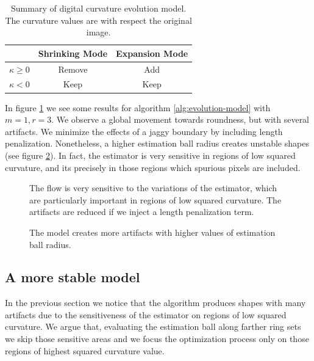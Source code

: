 \documentclass[runningheads]{llncs}
\begin{document}
\begin{table}
	\center
	\begin{tabular}{c|c|c}
		& Shrinking Mode & Expansion Mode\\
		\hline
		$\kappa \geq 0$ & Remove & Add\\
		$\kappa < 0$ & Keep	& Keep
	\end{tabular}
	\caption{Summary of digital curvature evolution model. The curvature values are with respect the original image.}		
	\label{tab:flow-summary}	
\end{table}

In figure \ref{fig:m1-square-flow} we see some results for algorithm \ref{alg:evolution-model} with $m=1,r=3$. We observe a global movement towards roundness, but with several artifacts. We minimize the effects of a jaggy boundary by including length penalization. Nonetheless, a higher estimation ball radius creates unstable shapes (see figure \ref{fig:m1-higher-ball-radius}). In fact, the estimator is very sensitive in regions of low squared curvature, and its precisely in those regions which spurious pixels are included.


\begin{figure}[!ht]
\caption{The flow is very sensitive to the variations of the estimator, which are particularly important in regions of low squared curvature. The artifacts are reduced if we inject a length penalization term. }
\label{fig:m1-square-flow}
\end{figure}



\begin{figure}[!ht]
\caption{The model creates more artifacts with higher values of estimation ball radius. }
\label{fig:m1-higher-ball-radius}
\end{figure}


\subsection{A more stable model}

In the previous section we notice that the algorithm produces shapes with many artifacts due to the sensitiveness of the estimator on regions of low squared curvature. We argue that, evaluating the estimation ball along farther ring sets we skip those sensitive areas and we focus the optimization process only on those regions of highest squared curvature value. 
\end{document}
